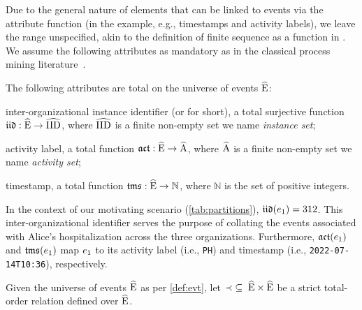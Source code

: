 \begin{newj}
Due to the general nature of elements that can be linked to events via the attribute function (in the example, e.g., timestamps and activity labels), we leave the range unspecified, akin to the definition of finite sequence as a function in \cite{Mendelson/2015:IntroductionMathematicalLogic}. We assume the following attributes as mandatory as in the classical process mining literature~\cite{Aalst/2016:ProcessMiningBook:DataScienceinAction}.
%
\begin{assumption}\label{post:mandatoryattributes}
	The following attributes are total on the universe of events $\widehat{\mathrm{E}}$:
	\begin{inparadesc}
		\item[inter-organizational instance identifier] (or {\CId} for short), a total surjective function $\mathfrak{iid} : \widehat{\mathrm{E}} \to \widehat{\mathrm{IID}}$, where $\widehat{\mathrm{IID}}$ is a finite non-empty set we name \emph{instance set};
		\item[activity label\textnormal{,}] a total function $\mathfrak{act} : \widehat{\mathrm{E}} \to \widehat{\mathrm{A}}$, where $\widehat{\mathrm{A}}$ is a finite non-empty set we name \emph{activity set};
		\item[timestamp\textnormal{,}] a total function $\mathfrak{tms} : \widehat{\mathrm{E}} \to \mathbb{N}$, where $\mathbb{N}$ is the set of positive integers.
	\end{inparadesc}
\end{assumption}
%
In the context of our motivating scenario (\cref{tab:partitions}), %
$\mathfrak{iid}(e_1) = 312$. This inter-organizational identifier serves the purpose of collating the events associated with Alice's hospitalization across the three organizations. Furthermore, %
{$\mathfrak{act}(e_1)$} and {$\mathfrak{tms}(e_1)$} map $e_1$ to its activity label (i.e., \texttt{PH}) and timestamp (i.e., \texttt{2022-07-14T10:36}), respectively.
%
\begin{definition}\label{def:evt:log}
	Given the universe of events $\widehat{\mathrm{E}}$ as per \cref{def:evt}, let ${\prec \;\subseteq\; \widehat{\mathrm{E}} \times \widehat{\mathrm{E}}}$ be a strict total-order relation defined over $\widehat{\mathrm{E}}$.

\end{definition}
\end{newj}
